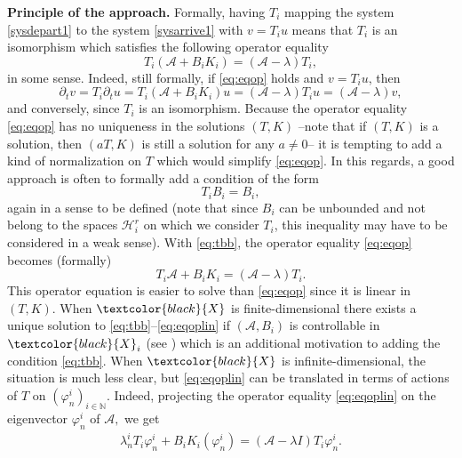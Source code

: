 \documentclass[11pt, dvipsnames]{amsart}
\begin{document}
\noindent \textbf{Principle of the approach.} Formally, having $T_{i}$ mapping the system \eqref{sysdepart1} to the system \eqref{sysarrive1} with $v=T_{i}u$ means that $T_{i}$ is an isomorphism which satisfies the following operator equality
\begin{equation}
\label{eq:eqop}
    T_{i}(\mathcal{A}+B_{i}K_{i}) = (\mathcal{A}-\lambda)T_{i},
\end{equation}
in some sense. Indeed, still formally, if \eqref{eq:eqop} holds and $v=T_{i}u$, then
\begin{equation}
    \partial_{t}v = T_{i}\partial_{t}u = T_{i}(\mathcal{A}+B_{i}K_{i})u = (\mathcal{A}-\lambda)T_{i}u = (\mathcal{A}-\lambda)v,
\end{equation}
and conversely, since $T_{i}$ is an isomorphism. Because the operator equality \eqref{eq:eqop} has no uniqueness in the solutions $(T,K)$ --note that if $(T,K)$ is a solution, then $(aT,K)$ is still a solution for any $a\neq0$-- it is tempting to add a kind of normalization on $T$ which would simplify \eqref{eq:eqop}. In this regards, a good approach is often to formally add a condition of the form 
\begin{equation}
\label{eq:tbb}
    T_iB_{i}= B_{i},
\end{equation}
again in a sense to be defined (note that since $B_{i}$ can be unbounded and not belong to the spaces $\mathcal{H}^{r}_{i}$ on which we consider $T_{i}$, this inequality may have to be considered in a weak sense). With \eqref{eq:tbb}, the operator equality \eqref{eq:eqop} becomes (formally) 
\begin{equation}
\label{eq:eqoplin}
    T_{i}\mathcal{A}+B_{i}K_{i} = (\mathcal{A}-\lambda)T_{i}.
\end{equation}
This operator equation is easier to solve than \eqref{eq:eqop} since it is linear in $(T,K)$. When $\textcolor{black}{X}$ is finite-dimensional there exists a unique solution to \eqref{eq:tbb}--\eqref{eq:eqoplin} if $(\mathcal{A},B_{i})$ is controllable in $\textcolor{black}{X}_{i}$ (see \cite{coron2015stabilization,Coron2022-stabilization}) which is an additional motivation to adding the condition \eqref{eq:tbb}. When $\textcolor{black}{X}$ is infinite-dimensional, the situation is much less clear, but 
\eqref{eq:eqoplin} can be translated in terms of actions of $T$ on $(\varphi^{i}_{n})_{i\in\mathbb{N}}$. Indeed,
projecting the operator equality \eqref{eq:eqoplin} on the eigenvector $\varphi_n^i$ of $\mathcal{A},$ we get
\begin{align}
    \lambda_n^i T_i\varphi_n^i+B_iK_i(\varphi_n^i)=(\mathcal{A}-\lambda I)T_i\varphi_n^i.\label{proj_1}
\end{align}
\end{document}

